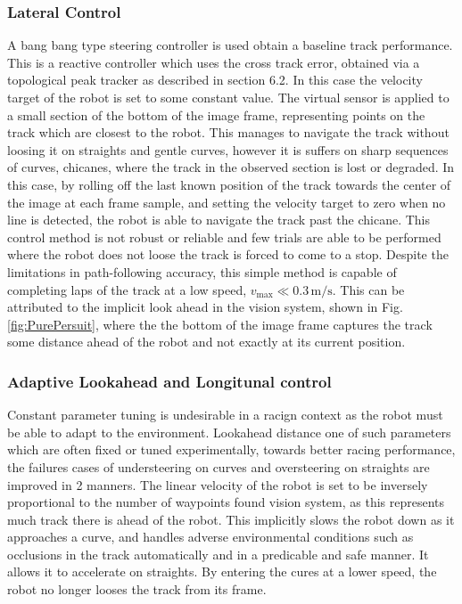             \subsubsection{Lateral Control}
            A bang bang type steering controller is used obtain a baseline track performance. 
            This is a reactive controller which uses the cross track error, obtained via a topological peak tracker as described in section 6.2.
            In this case the velocity target of the robot is set to some constant value. 
            The virtual sensor is applied to a small section of the bottom of the image frame, representing points on the track which are closest to the robot. 
            This manages to navigate the track without loosing it on straights and gentle curves, however it is suffers on
            sharp sequences of curves, chicanes, where the track in the observed section is lost or degraded. In this case, by rolling off the last known position 
            of the track towards the center of the image at each frame sample, and setting the velocity target to zero when no line is detected,
            the robot is able to navigate the track past the chicane. This control method is not robust or reliable and few trials are able to be performed where 
            the robot does not loose the track is forced to come to a stop.
            Despite the limitations in path-following accuracy, this simple method is capable of completing laps of the track at a
            low speed, \( v_{\text{max}} \ll 0.3 \, \text{m/s} \).
            This can be attributed to the implicit look ahead in the vision system, shown in Fig.\ref{fig:PurePersuit}, where the the bottom of the image frame 
            captures the track some distance ahead of the robot and not exactly at its current position.
            
            \subsubsection{Adaptive Lookahead and Longitunal control}
            Constant parameter tuning is undesirable in a racign context as the robot must be able to adapt to the environment.
            Lookahead distance one of such parameters which are often fixed or tuned experimentally,
            towards better racing performance, the failures cases of understeering on curves and oversteering on straights 
            are improved in 2 manners. The linear velocity of the robot is set to be inversely proportional to the number of waypoints found vision system,
            as this represents much track there is ahead of the robot. This implicitly slows the robot down as it approaches a curve, 
            and handles adverse environmental conditions such as occlusions in the track automatically and in a predicable and safe manner. 
            It allows it to accelerate on straights. By entering the cures at a lower speed, the robot no longer looses the track from its frame. 
            
